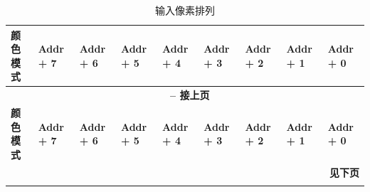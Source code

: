\documentclass[main\_\_CN.tex]{subfiles}
\begin{document}
\scriptsize
\begin{longtable}[c]{ |p{2cm}|p{1.5cm}|p{1.5cm}|p{1.5cm}|p{1.5cm}|p{1.5cm}|p{1.5cm}|p{1.5cm}|p{1.5cm}| }
    \caption{输入像素排列}
    \label{tab:input-pixel-arrangement}\\\hline

    \rowcolor{lightgray}
    \textbf{颜色模式} & \textbf{Addr + 7} & \textbf{Addr + 6} & \textbf{Addr + 5} & \textbf{Addr + 4} & \textbf{Addr + 3} & \textbf{Addr + 2} & \textbf{Addr + 1} & \textbf{Addr + 0} \\\hline
    \endfirsthead


    \multicolumn{9}{c}{\bfseries \tablename\ \thetable{} -- 接上页}\\\hline
    \rowcolor{lightgray}
    \textbf{颜色模式} & \textbf{Addr + 7} & \textbf{Addr + 6} & \textbf{Addr + 5} & \textbf{Addr + 4} & \textbf{Addr + 3} & \textbf{Addr + 2} & \textbf{Addr + 1} & \textbf{Addr + 0} \\\hline
    \endhead

    \multicolumn{9}{r}{\textbf{见下页}} \\
    \endfoot


\end{longtable}
\end{document}
